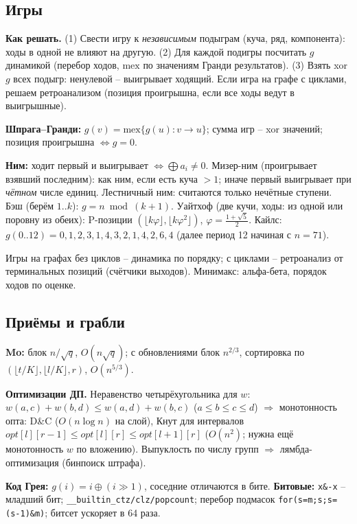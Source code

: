 \subsection{Игры}
\textbf{Как решать.} (1) Свести игру к \emph{независимым} подыграм (куча, ряд, компонента): ходы в одной не влияют на другую. (2) Для каждой подигры посчитать $g$ динамикой (перебор ходов, $\mathrm{mex}$ по значениям Гранди результатов). (3) Взять xor $g$ всех подыгр: ненулевой -- выигрывает ходящий. Если игра на графе с циклами, решаем ретроанализом (позиция проигрышна, если все ходы ведут в выигрышные).
\par \textbf{Шпрага--Гранди:} $g(v)=\mathrm{mex}\{g(u):v\to u\}$; сумма игр -- xor значений; позиция проигрышна $\iff g=0$.
\par \textbf{Ним:} ходит первый и выигрывает $\iff\bigoplus a_i\ne0$. Мизер-ним (проигрывает взявший последним): как ним, если есть куча $>1$; иначе первый выигрывает при \emph{чётном} числе единиц. Лестничный ним: считаются только нечётные ступени. Бэш (берём $1..k$): $g=n\bmod(k{+}1)$. Уайтхоф (две кучи, ходы: из одной или поровну из обеих): P-позиции $(\lfloor k\varphi\rfloor,\lfloor k\varphi^2\rfloor)$, $\varphi=\frac{1+\sqrt5}2$. Кайлс: $g(0..12)=0,1,2,3,1,4,3,2,1,4,2,6,4$ (далее период 12 начиная с $n=71$).
\par Игры на графах без циклов -- динамика по порядку; с циклами -- ретроанализ от терминальных позиций (счётчики выходов). Минимакс: альфа-бета, порядок ходов по оценке.
\subsection{Приёмы и грабли}
\par \textbf{Mo:} блок $n/\sqrt q$, $O(n\sqrt q)$; с обновлениями блок $n^{2/3}$, сортировка по $(\lfloor t/K\rfloor,\lfloor l/K\rfloor,r)$, $O(n^{5/3})$.
\par \textbf{Оптимизации ДП.} Неравенство четырёхугольника для $w$: $w(a,c)+w(b,d)\le w(a,d)+w(b,c)$ ($a\le b\le c\le d$) $\Rightarrow$ монотонность опта: D\&C ($O(n\log n)$ на слой), Кнут для интервалов $opt[l][r{-}1]\le opt[l][r]\le opt[l{+}1][r]$ ($O(n^2)$; нужна ещё монотонность $w$ по вложению). Выпуклость по числу групп $\Rightarrow$ лямбда-оптимизация (бинпоиск штрафа).
\par \textbf{Код Грея:} $g(i)=i\oplus(i\gg1)$, соседние отличаются в бите. \textbf{Битовые:} \texttt{x\&-x} -- младший бит; \texttt{\_\_builtin\_ctz/clz/popcount}; перебор подмасок \texttt{for(s=m;s;s=(s-1)\&m)}; битсет ускоряет в 64 раза.



